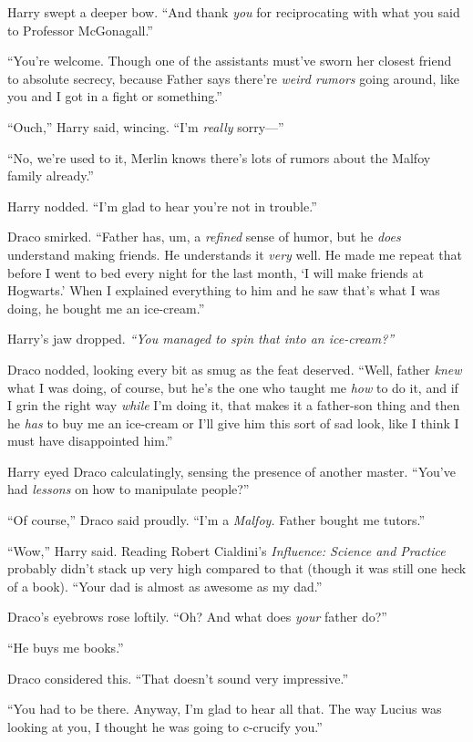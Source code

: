 Harry swept a deeper bow. ``And thank \emph{you} for reciprocating with
what you said to Professor McGonagall.''

``You're welcome. Though one of the assistants must've sworn her closest
friend to absolute secrecy, because Father says there're \emph{weird
rumors} going around, like you and I got in a fight or something.''

``Ouch,'' Harry said, wincing. ``I'm \emph{really} sorry---''

``No, we're used to it, Merlin knows there's lots of rumors about the
Malfoy family already.''

Harry nodded. ``I'm glad to hear you're not in trouble.''

Draco smirked. ``Father has, um, a \emph{refined} sense of humor, but he
\emph{does} understand making friends. He understands it \emph{very}
well. He made me repeat that before I went to bed every night for the
last month, `I will make friends at Hogwarts.' When I explained
everything to him and he saw that's what I was doing, he bought me an
ice-cream.''

Harry's jaw dropped. \emph{``You managed to spin that into an
ice-cream?''}

Draco nodded, looking every bit as smug as the feat deserved. ``Well,
father \emph{knew} what I was doing, of course, but he's the one who
taught me \emph{how} to do it, and if I grin the right way \emph{while}
I'm doing it, that makes it a father-son thing and then he \emph{has} to
buy me an ice-cream or I'll give him this sort of sad look, like I think
I must have disappointed him.''

Harry eyed Draco calculatingly, sensing the presence of another master.
``You've had \emph{lessons} on how to manipulate people?''

``Of course,'' Draco said proudly. ``I'm a \emph{Malfoy.} Father bought
me tutors.''

``Wow,'' Harry said. Reading Robert Cialdini's \emph{Influence: Science
and Practice} probably didn't stack up very high compared to that
(though it was still one heck of a book). ``Your dad is almost as
awesome as my dad.''

Draco's eyebrows rose loftily. ``Oh? And what does \emph{your} father
do?''

``He buys me books.''

Draco considered this. ``That doesn't sound very impressive.''

``You had to be there. Anyway, I'm glad to hear all that. The way Lucius
was looking at you, I thought he was going to c-crucify you.''

